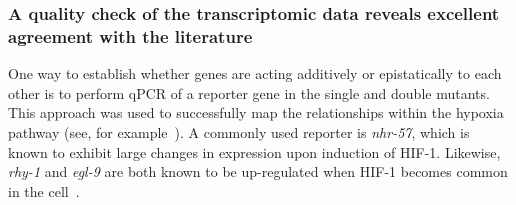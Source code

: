 \documentclass[9pt,twocolumn,twoside]{pnas-new}
\newcommand{\egl}{\emph{egl-9}}
\newcommand{\rhy}{\emph{rhy-1}}
\newcommand{\vhl}{\emph{vhl-1}}
\newcommand{\hif}{\emph{hif-1}}
\newcommand{\nhr}{\emph{nhr-57}}
\newcommand{\hifp}{HIF-1}
\begin{document}


\subsubsection*{A quality check of the transcriptomic data reveals excellent agreement
            with the literature}
\label{sub:qPCR}
One way to establish whether genes are acting additively or epistatically to each
other is to perform qPCR of a reporter gene in the single and double mutants. This
approach was used to successfully map the relationships within the hypoxia
pathway (see, for example~\cite{Shao2009,Shen2006}). A commonly used reporter is
\nhr{}, which is known to exhibit large changes in expression upon induction of
\hifp{}\cite{Shen2006,Shen2005,Ackerman2012,
Park2012}. Likewise, \rhy{} and \egl{} are both known to be up-regulated
when \hifp{} becomes common in the cell~\cite{}.
\end{document}
